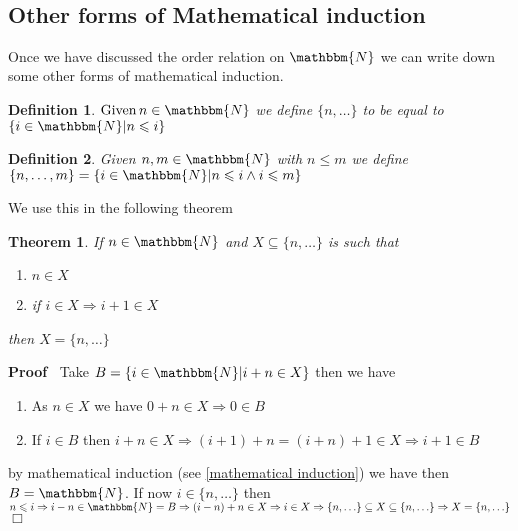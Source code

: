 \documentclass{book}
\newcommand{\tmop}[1]{\ensuremath{\operatorname{#1}}}
\newcommand{\um}{-}
\newcommand{\upl}{+}
\newenvironment{proof}{\noindent\textbf{Proof\ }}{\hspace*{\fill}$\Box$\medskip}
\newtheorem{definition}{Definition}
{\theorembodyfont{\rmfamily}\newtheorem{example}{Example}}
\newtheorem{theorem}{Theorem}
\begin{document}
{{\

\subsection{Other forms of Mathematical induction}

Once we have discussed the order relation on $\mathbbm{N}$ we can write down
some other forms of mathematical induction.

\begin{definition}
  {}$\tmop{Given} n \in \mathbbm{N}$ we define $\{ n,
  \ldots \}$ to be equal to $\{ i \in \mathbbm{N}|n \leqslant i \}$
\end{definition}

\begin{definition}
  Given $n, m \in \mathbbm{N}$ with $n \leqslant m$ we define $\{ n, \ldots, m
  \} = \{ i \in \mathbbm{N}|n \leqslant i \wedge i \leqslant m \}$
\end{definition}

We use this in the following theorem

\begin{theorem}
  \label{mathematical induction form 2}If $n \in \mathbbm{N}$ and $X \subseteq
  \{ n, \ldots \}$ is such that
  \begin{enumerate}
    \item $n \in X$
    
    \item if $i \in X \Rightarrow i \upl 1 \in X$
  \end{enumerate}
  then $X = \{ n, \ldots \}$
\end{theorem}

\begin{proof}
  Take $B = \{ i \in \mathbbm{N}|i \upl n \in X \}$ then we have
  \begin{enumerate}
    \item As $n \in X$ we have $0 \upl n \in X \Rightarrow 0 \in B$
    
    \item If $i \in B$ then $i \upl n \in X \Rightarrow (i \upl 1) \upl n = (i
    \upl n) \upl 1 \in X \Rightarrow i \upl 1 \in B$
  \end{enumerate}
  by mathematical induction (see \ref{mathematical induction}) we have then
  $B =\mathbbm{N}$. If now $i \in \{ n, \ldots \}$ then $n \leqslant i
  \Rightarrow i \um n \in \mathbbm{N}= B \Rightarrow (i \um n) \upl n \in X
  \Rightarrow i \in X \Rightarrow \{ n, \ldots \} \subseteq X \subseteq \{ n,
  \ldots \} \Rightarrow X = \{ n, \ldots \}$
\end{proof}

}}
\end{document}
